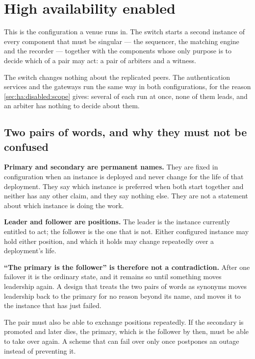 \section{High availability enabled}
\label{sec:ha:enabled}

This is the configuration a venue runs in. The switch starts a second instance
of every component that must be singular --- the sequencer, the matching engine
and the recorder --- together with the components whose only purpose is to
decide which of a pair may act: a pair of arbiters and a witness.

The switch changes nothing about the replicated peers. The authentication
services and the gateways run the same way in both configurations, for the reason
\cref{sec:ha:disabled:scope} gives: several of each run at once, none of them
leads, and an arbiter has nothing to decide about them.

\subsection{Two pairs of words, and why they must not be confused}
\label{sec:ha:enabled:vocabulary}

\textbf{Primary and secondary are permanent names.} They are fixed in
configuration when an instance is deployed and never change for the life of that
deployment. They say which instance is preferred when both start together and
neither has any other claim, and they say nothing else. They are not a statement
about which instance is doing the work.

\textbf{Leader and follower are positions.} The leader is the instance currently
entitled to act; the follower is the one that is not. Either configured instance
may hold either position, and which it holds may change repeatedly over a
deployment's life.

\textbf{``The primary is the follower'' is therefore not a contradiction.} After
one failover it is the ordinary state, and it remains so until something moves
leadership again. A design that treats the two pairs of words as synonyms moves
leadership back to the primary for no reason beyond its name, and moves it to the
instance that has just failed.

The pair must also be able to exchange positions repeatedly. If the secondary is
promoted and later dies, the primary, which is the follower by then, must be able
to take over again. A scheme that can fail over only once postpones an outage
instead of preventing it.


